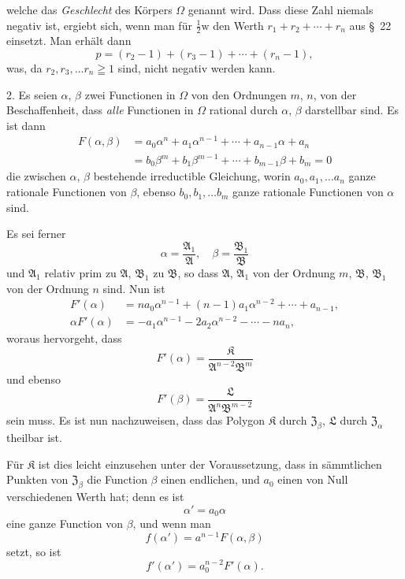 \documentclass{article}
\begin{document}
welche das \emph{Geschlecht} des Körpers $\Omega$ genannt wird. Dass diese Zahl niemals negativ ist, ergiebt sich, wenn man für $\frac{1}{2}\mathrm{w}$ den Werth $r_{1}+r_{2}+\cdots+r_{n}$ aus §~22 einsetzt. Man erhält dann
\[ p = (r_{2}-1)+(r_{3}-1)+\cdots+(r_{n}-1), \tag{2.} \]
was, da $r_{2}, r_{3}, \ldots r_{n} \geqq 1$ sind, nicht negativ werden kann.

2. Es seien $\alpha$, $\beta$ zwei Functionen in $\Omega$ von den Ordnungen $m$, $n$, von der Beschaffenheit, dass \emph{alle} Functionen in $\Omega$ rational durch $\alpha$, $\beta$ darstellbar sind. Es ist dann
\[ \begin{aligned} F(\alpha, \beta) &= a_{0}\alpha^{n} + a_{1}\alpha^{n-1} + \cdots + a_{n-1}\alpha + a_{n} \\ &= b_{0}\beta^{m} + b_{1}\beta^{m-1} + \cdots + b_{m-1}\beta + b_{m} = 0 \end{aligned} \]
die zwischen $\alpha$, $\beta$ bestehende irreductible Gleichung, worin $a_{0}, a_{1}, \ldots a_{n}$ ganze rationale Functionen von $\beta$, ebenso $b_{0}, b_{1}, \ldots b_{m}$ ganze rationale Functionen von $\alpha$ sind.

Es sei ferner
\[ \alpha = \frac{\mathfrak{A}_{1}}{\mathfrak{A}}, \quad \beta = \frac{\mathfrak{B}_{1}}{\mathfrak{B}} \]
und $\mathfrak{A}_{1}$ relativ prim zu $\mathfrak{A}$, $\mathfrak{B}_{1}$ zu $\mathfrak{B}$, so dass $\mathfrak{A}$, $\mathfrak{A}_{1}$ von der Ordnung $m$, $\mathfrak{B}$, $\mathfrak{B}_{1}$ von der Ordnung $n$ sind. Nun ist
\[ \begin{aligned} F'(\alpha) &= na_{0}\alpha^{n-1} + (n-1)a_{1}\alpha^{n-2} + \cdots + a_{n-1}, \\ \alpha F'(\alpha) &= -a_{1}\alpha^{n-1} - 2a_{2}\alpha^{n-2} - \cdots - na_{n}, \end{aligned} \]
woraus hervorgeht, dass
\[ F'(\alpha) = \frac{\mathfrak{K}}{\mathfrak{A}^{n-2}\mathfrak{B}^{m}} \]
und ebenso
\[ F'(\beta) = \frac{\mathfrak{L}}{\mathfrak{A}^{n}\mathfrak{B}^{m-2}} \]
sein muss. Es ist nun nachzuweisen, dass das Polygon $\mathfrak{K}$ durch $\mathfrak{Z}_{\beta}$, $\mathfrak{L}$ durch $\mathfrak{Z}_{\alpha}$ theilbar ist.

Für $\mathfrak{K}$ ist dies leicht einzusehen unter der Voraussetzung, dass in sämmtlichen Punkten von $\mathfrak{Z}_{\beta}$ die Function $\beta$ einen endlichen, und $a_{0}$ einen von Null verschiedenen Werth hat; denn es ist
\[ \alpha' = a_{0}\alpha \]
eine ganze Function von $\beta$, und wenn man
\[ f(\alpha') = a^{n-1}F(\alpha, \beta) \]
setzt, so ist
\[ f'(\alpha') = a_{0}^{n-2}F'(\alpha). \]
\end{document}
